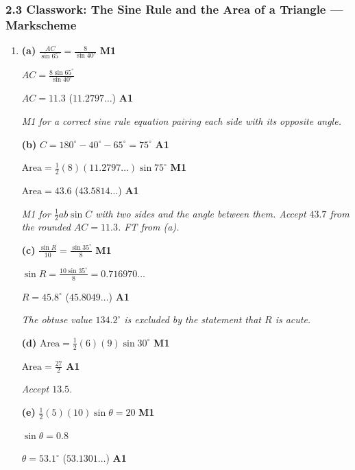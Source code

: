 \documentclass[12pt, twoside]{article}
\begin{document}
\subsubsection*{2.3 Classwork: The Sine Rule and the Area of a Triangle --- Markscheme}

\begin{enumerate}[itemsep=0.3cm]

\item[1.] [Maximum mark: 11]

\textbf{(a)} $\frac{AC}{\sin 65^\circ} = \frac{8}{\sin 40^\circ}$ \hfill \textbf{M1}

$AC = \frac{8\sin 65^\circ}{\sin 40^\circ}$

$AC = 11.3$ \quad ($11.2797\ldots$) \hfill \textbf{A1}

\emph{M1 for a correct sine rule equation pairing each side with its
opposite angle.}

\textbf{(b)} $C = 180^\circ - 40^\circ - 65^\circ = 75^\circ$ \hfill \textbf{A1}

$\text{Area} = \frac{1}{2}(8)(11.2797\ldots)\sin 75^\circ$ \hfill \textbf{M1}

$\text{Area} = 43.6$ \quad ($43.5814\ldots$) \hfill \textbf{A1}

\emph{M1 for $\frac{1}{2}ab\sin C$ with two sides and the angle between
them. Accept $43.7$ from the rounded $AC = 11.3$. FT from (a).}

\textbf{(c)} $\frac{\sin R}{10} = \frac{\sin 35^\circ}{8}$ \hfill \textbf{M1}

$\sin R = \frac{10\sin 35^\circ}{8} = 0.716970\ldots$

$R = 45.8^\circ$ \quad ($45.8049\ldots$) \hfill \textbf{A1}

\emph{The obtuse value $134.2^\circ$ is excluded by the statement that $R$
is acute.}

\textbf{(d)} $\text{Area} = \frac{1}{2}(6)(9)\sin 30^\circ$ \hfill \textbf{M1}

$\text{Area} = \frac{27}{2}$ \hfill \textbf{A1}

\emph{Accept $13.5$.}

\textbf{(e)} $\frac{1}{2}(5)(10)\sin\theta = 20$ \hfill \textbf{M1}

$\sin\theta = 0.8$

$\theta = 53.1^\circ$ \quad ($53.1301\ldots$) \hfill \textbf{A1}


\end{enumerate}
\end{document}
